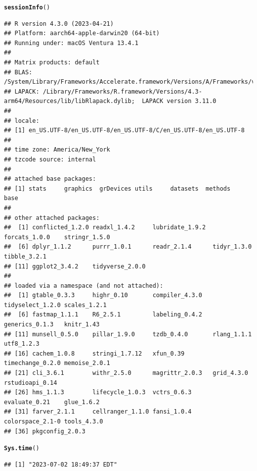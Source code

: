 \documentclass{article}\usepackage[]{graphicx}\usepackage[]{xcolor}
\makeatletter
\newcommand{\hlstd}[1]{\textcolor[rgb]{0.345,0.345,0.345}{#1}}%
\newcommand{\hlkwd}[1]{\textcolor[rgb]{0.737,0.353,0.396}{\textbf{#1}}}%
\newenvironment{kframe}{%
 \def\at@end@of@kframe{}%
 \ifinner\ifhmode%
  \def\at@end@of@kframe{\end{minipage}}%
  \begin{minipage}{\columnwidth}%
 \fi\fi%
 \def\FrameCommand##1{\hskip\@totalleftmargin \hskip-\fboxsep
 \colorbox{shadecolor}{##1}\hskip-\fboxsep
     \hskip-\linewidth \hskip-\@totalleftmargin \hskip\columnwidth}%
 \MakeFramed {\advance\hsize-\width
   \@totalleftmargin\z@ \linewidth\hsize
   \@setminipage}}%
 {\par\unskip\endMakeFramed%
 \at@end@of@kframe}
\newenvironment{knitrout}{}{} %
\makeatother
\begin{document}
\begin{knitrout}
\color{fgcolor}\begin{kframe}
\begin{alltt}
\hlkwd{sessionInfo}\hlstd{()}
\end{alltt}
\begin{verbatim}
## R version 4.3.0 (2023-04-21)
## Platform: aarch64-apple-darwin20 (64-bit)
## Running under: macOS Ventura 13.4.1
## 
## Matrix products: default
## BLAS:   /System/Library/Frameworks/Accelerate.framework/Versions/A/Frameworks/vecLib.framework/Versions/A/libBLAS.dylib 
## LAPACK: /Library/Frameworks/R.framework/Versions/4.3-arm64/Resources/lib/libRlapack.dylib;  LAPACK version 3.11.0
## 
## locale:
## [1] en_US.UTF-8/en_US.UTF-8/en_US.UTF-8/C/en_US.UTF-8/en_US.UTF-8
## 
## time zone: America/New_York
## tzcode source: internal
## 
## attached base packages:
## [1] stats     graphics  grDevices utils     datasets  methods   base     
## 
## other attached packages:
##  [1] conflicted_1.2.0 readxl_1.4.2     lubridate_1.9.2  forcats_1.0.0    stringr_1.5.0   
##  [6] dplyr_1.1.2      purrr_1.0.1      readr_2.1.4      tidyr_1.3.0      tibble_3.2.1    
## [11] ggplot2_3.4.2    tidyverse_2.0.0 
## 
## loaded via a namespace (and not attached):
##  [1] gtable_0.3.3     highr_0.10       compiler_4.3.0   tidyselect_1.2.0 scales_1.2.1    
##  [6] fastmap_1.1.1    R6_2.5.1         labeling_0.4.2   generics_0.1.3   knitr_1.43      
## [11] munsell_0.5.0    pillar_1.9.0     tzdb_0.4.0       rlang_1.1.1      utf8_1.2.3      
## [16] cachem_1.0.8     stringi_1.7.12   xfun_0.39        timechange_0.2.0 memoise_2.0.1   
## [21] cli_3.6.1        withr_2.5.0      magrittr_2.0.3   grid_4.3.0       rstudioapi_0.14 
## [26] hms_1.1.3        lifecycle_1.0.3  vctrs_0.6.3      evaluate_0.21    glue_1.6.2      
## [31] farver_2.1.1     cellranger_1.1.0 fansi_1.0.4      colorspace_2.1-0 tools_4.3.0     
## [36] pkgconfig_2.0.3
\end{verbatim}
\begin{alltt}
\hlkwd{Sys.time}\hlstd{()}
\end{alltt}
\begin{verbatim}
## [1] "2023-07-02 18:49:37 EDT"
\end{verbatim}
\end{kframe}
\end{knitrout}
\end{document}
